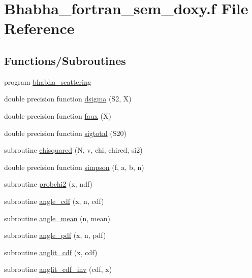 \hypertarget{_bhabha__fortran__sem__doxy_8f}{}\section{Bhabha\+\_\+fortran\+\_\+sem\+\_\+doxy.\+f File Reference}
\label{_bhabha__fortran__sem__doxy_8f}
\subsection*{Functions/\+Subroutines}
\begin{DoxyCompactItemize}
\item 
program \hyperlink{_bhabha__fortran__sem__doxy_8f_abb2a1b5ba16400d3f12a537f03a70349}{bhabha\+\_\+scattering}
\item 
double precision function \hyperlink{_bhabha__fortran__sem__doxy_8f_adb615d7a4a2665478c9f228d3281159e}{dsigma} (S2, X)
\item 
double precision function \hyperlink{_bhabha__fortran__sem__doxy_8f_a6ccd416a98c419022d77a6fc40b55868}{faux} (X)
\item 
double precision function \hyperlink{_bhabha__fortran__sem__doxy_8f_a17b8b02265e091acaccdfb4a9444019f}{sigtotal} (S20)
\item 
subroutine \hyperlink{_bhabha__fortran__sem__doxy_8f_a45708089271300abc165e88a11ab332e}{chisquared} (N, v, chi, chired, si2)
\item 
double precision function \hyperlink{_bhabha__fortran__sem__doxy_8f_a2ee8433b8e896ef918c415e17cb0e493}{simpson} (f, a, b, n)
\item 
subroutine \hyperlink{_bhabha__fortran__sem__doxy_8f_a74f0d3f55816e1b65f581a43349f89ba}{probchi2} (x, ndf)
\item 
subroutine \hyperlink{_bhabha__fortran__sem__doxy_8f_ae6b2a5c8e81763258a2b02d8ed0f4bc9}{angle\+\_\+cdf} (x, n, cdf)
\item 
subroutine \hyperlink{_bhabha__fortran__sem__doxy_8f_a83d4ecc8f5a46cbc25cac2fb7937bd44}{angle\+\_\+mean} (n, mean)
\item 
subroutine \hyperlink{_bhabha__fortran__sem__doxy_8f_aea97ae5ed563aa63a80df4f38d19e289}{angle\+\_\+pdf} (x, n, pdf)
\item 
subroutine \hyperlink{_bhabha__fortran__sem__doxy_8f_ae6f220f29d92fd5e4ac84c22029dcbc5}{anglit\+\_\+cdf} (x, cdf)
\item 
subroutine \hyperlink{_bhabha__fortran__sem__doxy_8f_aac69fb6d192dd21c8a01a0b768047f59}{anglit\+\_\+cdf\+\_\+inv} (cdf, x)

\end{DoxyCompactItemize}
